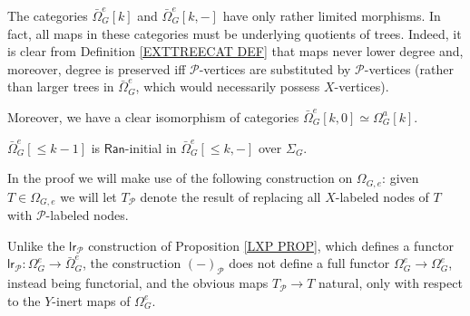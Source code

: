 \documentclass[a4paper,10pt]{article}%
\begin{document}
\begin{remark}\label{LIMMOR REM}
  The categories $\bar{\Omega}_G^e[k]$ and $\bar{\Omega}_G^e[k,-]$ have only rather limited morphisms.
  In fact, all maps in these categories must be underlying quotients of trees. Indeed, it is clear from Definition \ref{EXTTREECAT DEF} that maps never lower degree and, moreover, degree is preserved iff $\mathcal{P}$-vertices are substituted by $\mathcal{P}$-vertices (rather than larger trees in $\bar{\Omega}_G^e$, which would necessarily possess $X$-vertices).
  
  Moreover, we have a clear isomorphism of categories $\bar\Omega_G^e[k,0] \simeq \Omega_G^a[k]$. 
\end{remark}


\begin{lemma}\label{MINUS_LAN_FINAL_LEMMA}
  $\bar{\Omega}_G^e[\leq k-1]$ is $\mathsf{Ran}$-initial in $\bar{\Omega}_G^{e}[\leq k,-]$ over $\Sigma_G$.
\end{lemma}

In the proof we will make use of the following construction on 
$\Omega_{G,e}$: given $T \in \Omega_{G,e}$ we will let $T_{\mathcal{P}}$ denote the result of replacing all $X$-labeled nodes of $T$ with $\mathcal{P}$-labeled nodes.

\begin{remark}\label{YINERT REM}
  Unlike the $\mathsf{lr}_{\mathcal{P}}$ construction of Proposition \ref{LXP PROP}, which defines a functor 
  $\mathsf{lr}_{\mathcal{P}} \colon
  \Omega_G^e \to \bar{\Omega}_G^e $,
  the construction 
  $(\minus)_{\mathcal{P}}$ does not define a full functor
  $\Omega_G^e \to \Omega_G^e$, instead being functorial, and the obvious maps $T_{\mathcal{P}} \to T$ natural, only with respect to the $Y$-inert maps of $\Omega_G^e$.
\end{remark}
\end{document}
